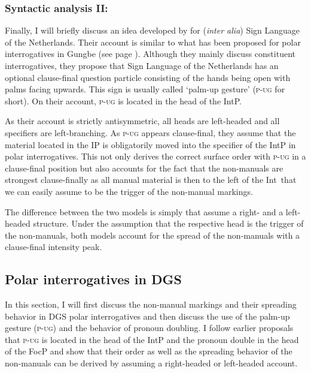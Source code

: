\subsubsection{Syntactic analysis II: \citet{aboh2010sa}}
Finally, I will briefly discuss an idea developed by \citet{aboh2010sa} for (\textit{inter alia}) Sign Language of the Netherlands. Their account is similar to what has been proposed for polar interrogatives in Gungbe (see page \pageref{ex:gungbepolarinterrogativetree}). Although they mainly discuss constituent interrogatives, they propose that Sign Language of the Netherlands has an optional clause-final question particle consisting of the hands being open with palms facing upwards. This sign is usually called `palm-up gesture' (\textsc{p-ug} for short). On their account, \textsc{p-ug} is located in the head of the IntP. 

As their account is strictly antisymmetric, all heads are left-headed and all specifiers are left-branching. As \textsc{p-ug} appears clause-final, they assume that the material located in the IP is obligatorily moved into the specifier of the IntP in polar interrogatives. This not only derives the correct surface order with \textsc{p-ug} in a clause-final position but also accounts for the fact that the non-manuals are strongest clause-finally as all manual material is then to the left of the Int\textdegree\ that we can easily assume to be the trigger of the non-manual markings.

The difference between the two models is simply that \citet{sarac2006interrogative} assume a right- and \citet{aboh2010sa} a left-headed structure. Under the assumption that the respective head is the trigger of the non-manuals, both models account for the spread of the non-manuals with a clause-final intensity peak.

\subsection{Polar interrogatives in DGS}\label{polarinterrogativesdgs}
In this section, I will first discuss the non-manual markings and their spreading behavior in DGS polar interrogatives and then discuss the use of the palm-up gesture (\textsc{p-ug}) and the behavior of pronoun doubling. I follow earlier proposals that \textsc{p-ug} is located in the head of the IntP \citep{aboh2010sa} and the pronoun double in the head of the FocP \citep{de1999phrase} and show that their order as well as the spreading behavior of the non-manuals can be derived by assuming a right-headed or left-headed account.

